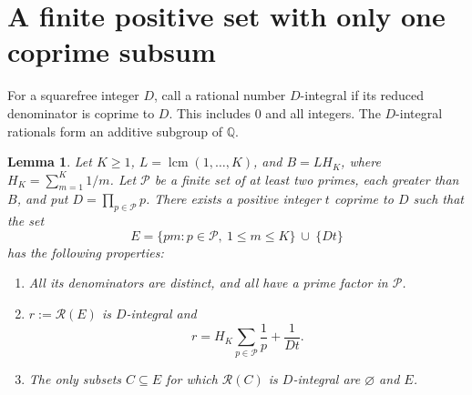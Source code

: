\documentclass[11pt]{article}
\newtheorem{lemma}[theorem]{Lemma}
\newcommand{\R}{\mathcal R}
\newcommand{\lcm}{\operatorname{lcm}}
\begin{document}
\section{A finite positive set with only one coprime subsum}
For a squarefree integer $D$, call a rational number $D$-integral if its
reduced denominator is coprime to $D$. This includes $0$ and all integers.
The $D$-integral rationals form an additive subgroup of $\mathbb Q$.

\begin{lemma}\label{crt}
Let $K\ge1$, $L=\lcm(1,\ldots,K)$, and $B=LH_K$, where
$H_K=\sum_{m=1}^K1/m$.
Let $\mathcal P$ be a finite set of at least two primes, each greater
than $B$, and put $D=\prod_{p\in\mathcal P}p$.
There exists a positive integer $t$ coprime to $D$ such that the set
\[
 E=\{pm:p\in\mathcal P,\ 1\le m\le K\}\ \cup\ \{Dt\}
\]
has the following properties:
\begin{enumerate}
\item All its denominators are distinct, and all have a prime factor in
$\mathcal P$.
\item $r:=\R(E)$ is $D$-integral and
\[
 r=H_K\sum_{p\in\mathcal P}\frac1p+\frac1{Dt}.
\]
\item The only subsets $C\subseteq E$ for which $\R(C)$ is
$D$-integral are $\varnothing$ and $E$.
\end{enumerate}
\end{lemma}
\end{document}
